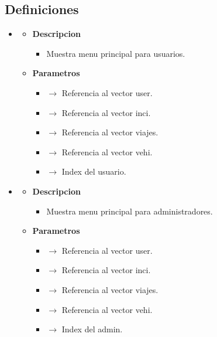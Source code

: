 \subsection{Definiciones}
\begin{itemize}
     \item \label{menuUser}
    \begin{itemize}
        \item \textbf{Descripcion}
        \begin{itemize}
			\item Muestra menu principal para usuarios.
		\end{itemize}
		\item \textbf{Parametros}
		\begin{itemize}
			\item {} $\rightarrow$ Referencia al vector user.
			\item {} $\rightarrow$ Referencia al vector inci.
			\item {} $\rightarrow$ Referencia al vector viajes.
			\item {} $\rightarrow$ Referencia al vector vehi.
			\item {} $\rightarrow$ Index del usuario.
		\end{itemize}
		
	\end{itemize}
    \item \label{menuAdmin}
    \begin{itemize}
        \item \textbf{Descripcion}
        \begin{itemize}
			\item Muestra menu principal para administradores.
		\end{itemize}
		\item \textbf{Parametros}
		\begin{itemize}
			\item {} $\rightarrow$ Referencia al vector user.
			\item {} $\rightarrow$ Referencia al vector inci.
			\item {} $\rightarrow$ Referencia al vector viajes.
			\item {} $\rightarrow$ Referencia al vector vehi.
			\item {} $\rightarrow$ Index del admin.
		\end{itemize}
		
	\end{itemize}

\end{itemize}
